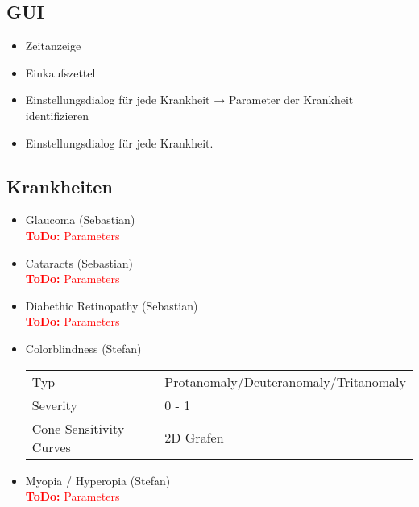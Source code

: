 \documentclass[a4paper, 11pt]{scrartcl}
\newcommand{\todo}[1]{\textcolor{Red}{\textbf{ToDo: }#1}}
\newcommand{\entwickler}[1]{\textcolor{BurntOrange}{(#1)}}
\newcommand{\Stefan}{\entwickler{Stefan}}
\newcommand{\Sebastian}{\entwickler{Sebastian}}
\begin{document}
\subsection{GUI}
\begin{itemize}
    \item Zeitanzeige
    \item Einkaufszettel
    \item Einstellungsdialog für jede Krankheit → Parameter der Krankheit identifizieren
    \item Einstellungsdialog für jede Krankheit.
\end{itemize}


\subsection{Krankheiten}
\begin{itemize}
    \item Glaucoma \Sebastian \\
    \todo{Parameters}
    \item Cataracts \Sebastian \\
    \todo{Parameters}
    \item Diabethic Retinopathy \Sebastian \\
    \todo{Parameters}
    \item Colorblindness \Stefan \\
    \begin{tabular}{ll}
        Typ & Protanomaly/Deuteranomaly/Tritanomaly \\
        Severity & 0 - 1 \\
        Cone Sensitivity Curves & 2D Grafen \\
    \end{tabular}
    \item Myopia / Hyperopia \Stefan \\
    \todo{Parameters}
\end{itemize}
\end{document}
